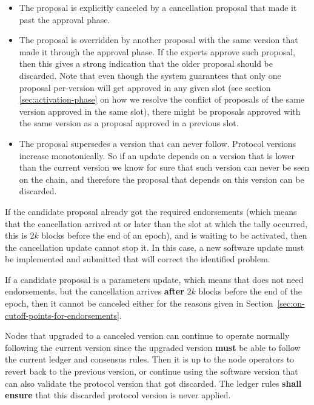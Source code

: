 \begin{itemize}
	\item The proposal is explicitly canceled by a cancellation proposal that 
	made
	it past the approval phase.
	\item The proposal is overridden by another proposal with the same version 
	that
	made it through the approval phase. If the experts approve such proposal, 
	then
	this gives a strong indication that the older proposal should be discarded.
	Note that even though the system guarantees that only one proposal 
	per-version
	will get approved in any given slot (see section \ref{sec:activation-phase} 
	on how we resolve the conflict of proposals of the same version approved in 
	the same slot), 
	there might be proposals approved with
	the same version as a proposal approved in a previous slot.
	\item The proposal supersedes a version that can never follow. Protocol 
	versions
	increase monotonically. So if an update depends on a version that is lower
	than the current version we know for sure that such version can never be 
	seen
	on the chain, and therefore the proposal that depends on this version can be
	discarded.
\end{itemize}

If the candidate proposal already got the required endorsements (which means
that the cancellation arrived at or later than the slot at which the tally
occurred, this is $2k$ blocks before the end of an epoch), and is waiting to
be activated, then the cancellation update cannot stop it. In this case, a new
software update must be implemented and submitted that will correct the
identified problem.

If a candidate proposal is a parameters update, which means that does not need
endorsements, but the cancellation arrives \textbf{after} $2k$ blocks before
the end of the epoch, then it cannot be canceled either for the reasons given in
Section~\ref{sec:on-cutoff-points-for-endorsements}.

Nodes that upgraded to a canceled version can continue to operate normally
following the current version since the upgraded version \textbf{must} be able
to follow the current ledger and consensus rules.
%
Then it is up to the node operators to revert back to the previous version, or
continue using the software version that can also validate the protocol version
that got discarded. The ledger rules \textbf{shall ensure} that this discarded
protocol version is never applied.

